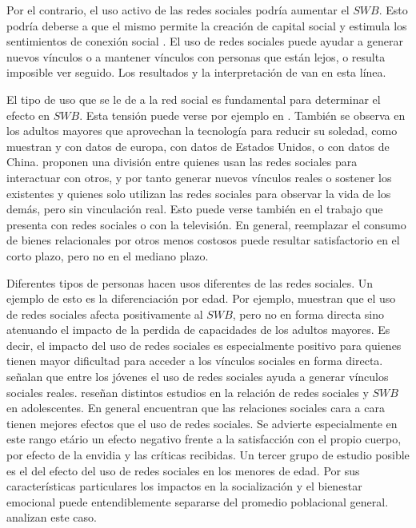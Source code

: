 \documentclass[11pt]{article}
\begin{document}
Por el contrario, el uso activo de las redes sociales podría aumentar el $SWB$. Esto podría deberse a que el mismo permite la creación de capital social y estimula los sentimientos de conexión social \cite{Easterlin2021}. El uso de redes sociales puede ayudar a generar nuevos vínculos o a mantener vínculos con personas que están lejos, o resulta imposible ver seguido. Los resultados y la interpretación de  van en esta línea. 

El tipo de uso que se le de a la red social es fundamental para determinar el  efecto en $SWB$. Esta tensión puede verse por ejemplo en . También se observa en los adultos mayores que aprovechan la tecnología para reducir su soledad, como muestran  y  con datos de europa,  con datos de Estados Unidos, o  con datos de China.  proponen una división entre quienes usan las redes sociales para interactuar con otros, y por tanto generar nuevos vínculos reales o sostener los existentes y quienes solo utilizan las redes sociales para observar la vida de los demás, pero sin vinculación real. Esto puede verse también en el trabajo que presenta  con redes sociales o  con la televisión. En general, reemplazar el consumo de bienes relacionales por otros menos costosos puede resultar satisfactorio en el corto plazo, pero no en el mediano plazo. 

Diferentes tipos de personas hacen usos diferentes de las redes sociales. Un ejemplo de esto es la diferenciación por edad. Por ejemplo,  muestran que el uso de redes sociales afecta positivamente al $SWB$, pero no en forma directa sino atenuando el impacto de la perdida de capacidades de los adultos mayores. Es decir, el impacto del uso de redes sociales es especialmente positivo para quienes tienen mayor dificultad para acceder a los vínculos sociales en forma directa.  señalan que entre los jóvenes el uso de redes sociales ayuda a generar vínculos sociales reales.  reseñan distintos estudios en la relación de redes sociales y $SWB$ en adolescentes. En general encuentran que las relaciones sociales cara a cara tienen mejores efectos que el uso de redes sociales. Se advierte especialmente en este rango etário un efecto negativo frente a la satisfacción con el propio cuerpo, por efecto de la envidia y las críticas recibidas. Un tercer grupo de estudio posible es el del efecto del uso de redes sociales en los menores de edad. Por sus características particulares los impactos en la socialización y el bienestar emocional puede entendiblemente separarse del promedio poblacional general.  analizan este caso. 
\end{document}
